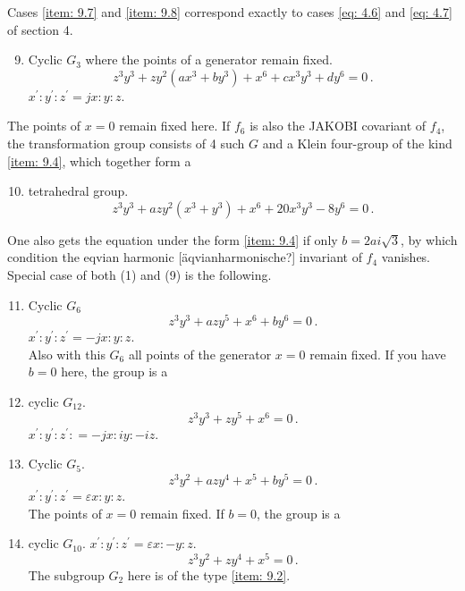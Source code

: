 \documentclass[leqno]{article}
\begin{document}
Cases \ref{item: 9.7} and \ref{item: 9.8} correspond exactly to cases \eqref{eq: 4.6} and \eqref{eq: 4.7} of section 4.
\begin{enumerate}[label=\arabic*)]
    \setcounter{enumi}{8}
    \item \label{item: 9.9}Cyclic $G_3$ where the points of a generator remain fixed.
    \begin{equation}\label{eq: 9.9}
        z^3 y^3 + z y^2 (ax^3 + by^3) + x^6 + c x^3 y^3 + d y^6 = 0 \, . \tag{9}
    \end{equation}
    $x^\prime : y^\prime : z^\prime = jx : y : z$. 
\end{enumerate}
The points of $x=0$ remain fixed here. If $f_6$ is also the JAKOBI covariant of $f_4$, the transformation group consists of 4 such $G$ and a Klein four-group of the kind \ref{item: 9.4}, which together form a
\begin{enumerate}[label=\arabic*)]
    \setcounter{enumi}{9}
    \item \label{item: 9.10}tetrahedral group. 
    \begin{equation}\label{eq: 9.10}
        z^3 y^3 + a z y^2(x^3 + y^3) + x^6 + 20x^3 y^3-8y^6 = 0 \, . \tag{10}
    \end{equation}
\end{enumerate}
One also gets the equation under the form \ref{item: 9.4} if only $b=2ai\sqrt{3}$, by which condition the eqvian harmonic [\"aqvianharmonische?] invariant of $f_4$ vanishes. Special case of both (1) and (9) is the following.
\begin{enumerate}[label=\arabic*)]
    \setcounter{enumi}{10}
    \item \label{item: 9.11}Cyclic $G_6$
    \begin{equation}\label{eq: 9.11}
        z^3 y^3 + a z y^5 + x^6 + b y^6 = 0 \, . \tag{11}
    \end{equation}
    $x^\prime : y^\prime : z^\prime = -jx : y: z$. \\
     Also with this $G_6$ all points of the generator $x=0$ remain fixed. If you have $b=0$ here, the group is a 
	\item cyclic $G_{12}$.
	\begin{equation}\label{eq: 9.12}
	z^3 y^3 + zy^5 + x^6 = 0 \, . \tag{12}
	\end{equation}
	$x^\prime : y^\prime : z^\prime: = -jx : iy : -iz$. 
	\item Cyclic $G_5$.
	\begin{equation}\label{eq: 9.13}
	z^3 y^2 + azy^4 + x^5 + by^5 = 0 \, . \tag{13}
	\end{equation}
	$x^\prime : y^\prime : z^\prime = \varepsilon x : y: z$. \\
	The points of $x=0$ remain fixed. If $b=0$, the group is a 
	\item cyclic $G_{10}$. $x^\prime : y^\prime : z^\prime = \varepsilon x : -y : z$. 
	\begin{equation}\label{eq: 9.14}
	z^3 y^2 + zy^4 + x^5 = 0 \, . \tag{14}
	\end{equation}
	The subgroup $G_2$ here is of the type \ref{item: 9.2}. 
\end{enumerate}
\end{document}
